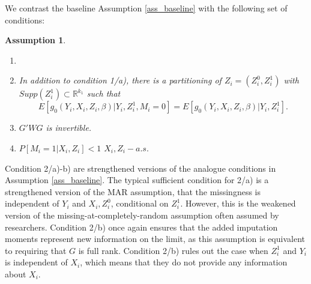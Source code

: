 \documentclass{article}
\newtheorem{assumption}{Assumption}
\theoremstyle{definition}
\theoremstyle{remark}
\begin{document}
We contrast the baseline Assumption \ref{ass_baseline} with the following set of conditions:
\begin{assumption}\label{ass_genericImputation}
	\begin{enumerate}
		\item[]
		\item[a)] In addition to condition 1/a), there is a partitioning of $Z_i=(Z_i^0, Z_i^1)$ with $Supp(Z_i^1) \subset \mathbb{R}^{k_1}$ such that
		\[E[g_0(Y_i, X_i, Z_i, \beta)|Y_i, Z^1_i,  M_i=0] = E[g_0(Y_i, X_i, Z_i, \beta)|Y_i, Z^1_i].
		\]
		\item[b)] $G'WG$ is invertible.
		\item[c)] $P[M_i=1|X_i,Z_i]<1$ $X_i,Z_i-a.s.$
	\end{enumerate}
\end{assumption}
Condition 2/a)-b) are strengthened versions of the analogue conditions in Assumption \ref{ass_baseline}. The typical sufficient condition for 2/a) is a strengthened version of the MAR assumption, that the missingness is independent of $Y_i$ and $X_i, Z_i^0$, conditional on $Z_i^1$. However, this is the weakened version of the missing-at-completely-random assumption often assumed by researchers. Condition 2/b) once again ensures that the added imputation moments represent new information on the limit, as this assumption is equivalent to requiring that $G$ is full rank. Condition 2/b) rules out the case when $Z_i^1$ and $Y_i$ is independent of $X_i$, which means that they do not provide any information about $X_i$.
\end{document}
